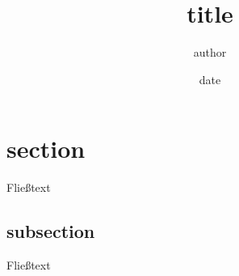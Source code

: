 \documentclass[a4paper,12pt]{article}
\begin{document}
\title{title}
\author{author}
\date{date}

\maketitle

\newpage

\tableofcontents

\newpage

\section{section}

Fließtext
\subsection{subsection}

Fließtext
\end{document}
